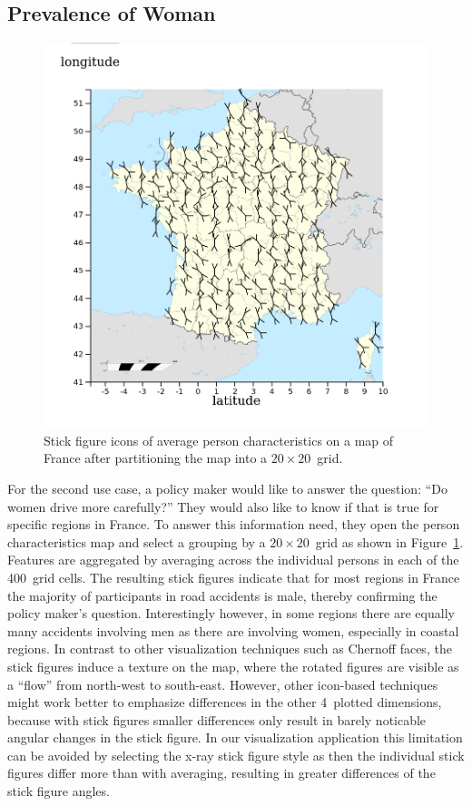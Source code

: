 \subsection{Prevalence of Woman}
\begin{figure}
    \centering
    \includegraphics[width=0.6\linewidth]{figures/stick-figures-by-grid-20-20-average.png}
    \caption{Stick figure icons of average person characteristics on a map of France after partitioning the map into a \(20 \times 20\)~grid.}
    \label{figure-stick-figures-grid-average}
\end{figure}
For the second use case, a policy maker would like to answer the question: \enquote{Do women drive more carefully?} They would also like to know if that is true for specific regions in France.
To answer this information need, they open the person characteristics map and select a grouping by a \(20 \times 20\)~grid as shown in Figure~\ref{figure-stick-figures-grid-average}.
Features are aggregated by averaging across the individual persons in each of the 400~grid cells. The resulting stick figures indicate that for most regions in France the majority of participants in road accidents is male, thereby confirming the policy maker's question.
Interestingly however, in some regions there are equally many accidents involving men as there are involving women, especially in coastal regions.
In contrast to other visualization techniques such as Chernoff faces, the stick figures induce a texture on the map, where the rotated figures are visible as a \enquote{flow} from north-west to south-east.
However, other icon-based techniques might work better to emphasize differences in the other 4~plotted dimensions, because with stick figures smaller differences only result in barely noticable angular changes in the stick figure.
In our visualization application this limitation can be avoided by selecting the x-ray stick figure style as then the individual stick figures differ more than with averaging, resulting in greater differences of the stick figure angles.

